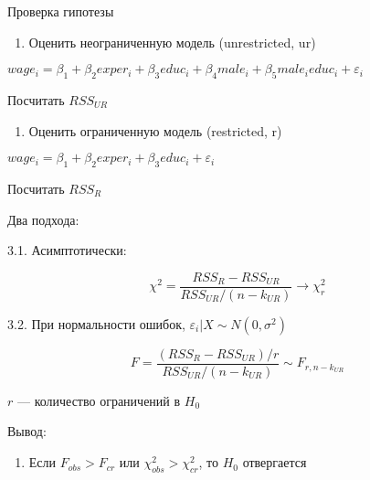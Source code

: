 \documentclass[ignorenonframetext,]{beamer}
\begin{document}
\begin{frame}{Проверка гипотезы}

\begin{enumerate}
\def\labelenumi{\arabic{enumi}.}
\itemsep1pt\parskip0pt
\item
  Оценить неограниченную модель (unrestricted, ur)
\end{enumerate}

\(wage_i = \beta_1 + \beta_2 exper_i + \beta_3 educ_i + \beta_4 male_i + \beta_5 male_i educ_i + \varepsilon_i\)

Посчитать \(RSS_{UR}\)

\begin{enumerate}
\def\labelenumi{\arabic{enumi}.}
\setcounter{enumi}{1}
\itemsep1pt\parskip0pt
\item
  Оценить ограниченную модель (restricted, r)
\end{enumerate}

\(wage_i = \beta_1 + \beta_2 exper_i + \beta_3 educ_i + \varepsilon_i\)

Посчитать \(RSS_{R}\)

\end{frame}

\begin{frame}{Два подхода:}

3.1. Асимптотически:

\[
\chi^2=\frac{RSS_R-RSS_{UR}}{RSS_{UR}/(n-k_{UR})} \to \chi^2_r
\]

3.2. При нормальности ошибок, \(\varepsilon_i |X \sim N(0,\sigma^2)\)

\[
F=\frac{(RSS_R-RSS_{UR})/r}{RSS_{UR}/(n-k_{UR})} \sim F_{r, n-k_{UR}}
\]

\(r\) --- количество ограничений в \(H_0\)

\end{frame}

\begin{frame}{Вывод:}

\begin{enumerate}
\def\labelenumi{\arabic{enumi}.}
\setcounter{enumi}{3}
\itemsep1pt\parskip0pt
\item
  Если \(F_{obs}>F_{cr}\) или \(\chi^2_{obs}>\chi^2_{cr}\), то \(H_0\)
  отвергается
\end{enumerate}

\end{frame}
\end{document}
